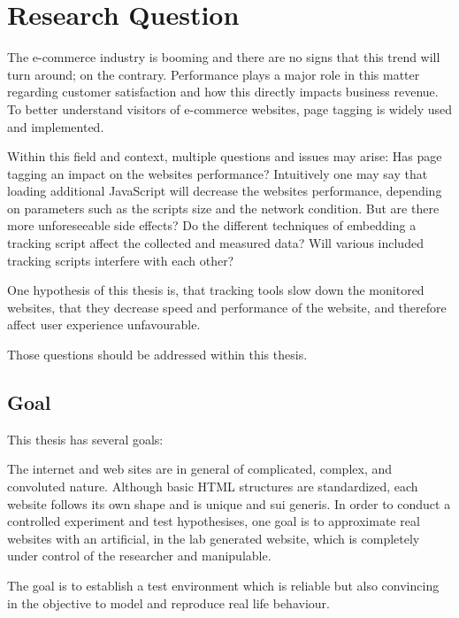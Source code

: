 

\section{Research Question}

The e-commerce industry is booming and there are no signs that this trend will turn around; on the contrary.
Performance plays a major role in this matter regarding customer satisfaction and how this directly impacts business revenue.
To better understand visitors of e-commerce websites, page tagging is widely used and implemented.

Within this field and context, multiple questions and issues may arise: Has page tagging an impact on the websites performance?
Intuitively one may say that loading additional JavaScript will decrease the websites performance, depending on parameters such as the scripts size and the network condition.
But are there more unforeseeable side effects?
Do the different techniques of embedding a tracking script affect the collected and measured data?
Will various included tracking scripts interfere with each other?

One hypothesis of this thesis is, that tracking tools slow down the monitored websites, that they decrease speed and performance of the website, and therefore affect user experience unfavourable.

Those questions should be addressed within this thesis.


\subsection{Goal}

This thesis has several goals:

The internet and web sites are in general of complicated, complex, and convoluted nature.
Although basic HTML structures are standardized, each website follows its own shape and is unique and sui generis.
In order to conduct a controlled experiment and test hypothesises, one goal is to approximate real websites with an artificial, in the lab generated website, which is completely under control of the researcher and manipulable.

The goal is to establish a test environment which is reliable but also convincing in the objective to model and reproduce real life behaviour.

